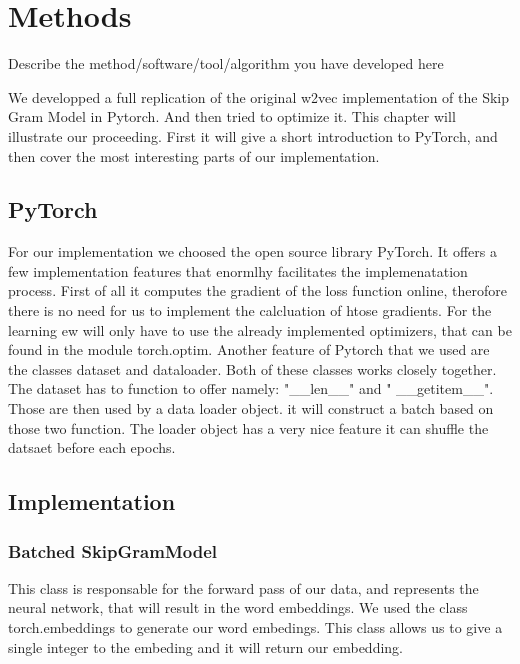 \chapter{Methods}\label{chap:methods}
Describe the method/software/tool/algorithm you have developed here

We developped a  full replication of the original w2vec implementation of the Skip Gram Model in Pytorch. And then tried to optimize it. This chapter will illustrate our proceeding. First it will give a short introduction to PyTorch, and then cover the most interesting parts of our implementation. 
\section{PyTorch}
For our implementation we choosed the open source library PyTorch. It offers a few  implementation features that enormlhy facilitates the implemenatation process. First of all it computes the gradient of the loss function online, therofore there is no need for us to implement the calcluation of htose gradients. For the learning ew will only have to use the already implemented optimizers, that can be found in the module torch.optim. Another feature of Pytorch that we used are the classes dataset and dataloader. Both of these classes works closely together.   The dataset has to function to offer namely: "\_\_len\_\_" and " \_\_getitem\_\_". Those are then used by a data loader object. it will construct a batch based on those two function. The loader object has a very nice feature it can shuffle the datsaet before each epochs. 
\section{Implementation}
\subsection{Batched SkipGramModel}
This class is responsable for the forward pass of our data, and represents the neural network, that will result in the word embeddings. We used the class torch.embeddings to generate our word embedings. This class allows us to give a single integer to the embeding and it will return our embedding.  
